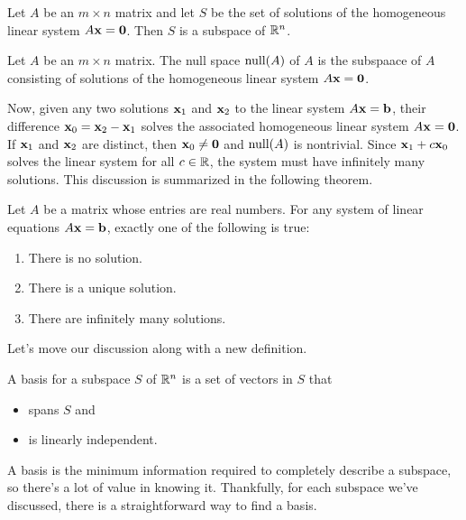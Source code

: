 \documentclass[../m73main.tex]{subfiles}
\begin{document}
\begin{theorem}
	Let $A$ be an $m\times n$ matrix and let $S$ be the set of solutions of the homogeneous linear system $A\mathbf{x} = \mathbf{0}$.
	Then $S$ is a subspace of $\mathbb{R}^n$.
\end{theorem}

\begin{definition}
	Let $A$ be an $m\times n$ matrix.
	The null space $\textrm{null}(A)$ of $A$ is the subspaace of $A$ consisting of solutions of the homogeneous linear system $A\mathbf{x} = \mathbf{0}$.
\end{definition}

Now, given any two solutions $\mathbf{x}_1$ and $\mathbf{x}_2$ to the linear system $A\mathbf{x} = \mathbf{b}$, their difference $\mathbf{x}_0 = \mathbf{x}_2 - \mathbf{x}_1$ solves the associated homogeneous linear system $A\mathbf{x} = \mathbf{0}$.
If $\mathbf{x}_1$ and $\mathbf{x}_2$ are distinct, then $\mathbf{x}_0 \neq \mathbf{0}$ and $\textrm{null} (A)$ is nontrivial.
Since $\mathbf{x}_1 + c\mathbf{x}_0$ solves the linear system for all $c \in \mathbb{R}$, the system must have infinitely many solutions.
This discussion is summarized in the following theorem.

\begin{theorem}
	Let $A$ be a matrix whose entries are real numbers.
	For any system of linear equations $A\mathbf{x} = \mathbf{b}$, exactly one of the following is true:
	\begin{enumerate}[label=(\alph*)]
		\item There is no solution.
		\item There is a unique solution.
		\item There are infinitely many solutions.
	\end{enumerate}
\end{theorem}

Let's move our discussion along with a new definition.

\begin{definition}
	A basis for a subspace $S$ of $\mathbb{R}^n$ is a set of vectors in $S$ that
	\begin{itemize}
		\item spans $S$ and
		\item is linearly independent.
	\end{itemize}
\end{definition}

A basis is the minimum information required to completely describe a subspace, so there's a lot of value in knowing it.
Thankfully, for each subspace we've discussed, there is a straightforward way to find a basis.
\end{document}
